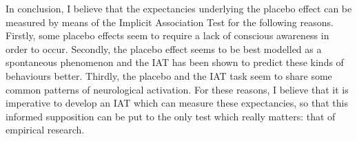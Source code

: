 In conclusion, I believe that the expectancies underlying the placebo effect can be measured by means of the Implicit Association Test for the following reasons. Firstly, some placebo effects seem to require a lack of conscious awareness in order to occur. Secondly, the placebo effect seems to be best modelled as a spontaneous phenomenon and the IAT has been shown to predict these kinds of behaviours better. Thirdly, the placebo and the IAT task seem to share some common patterns of neurological activation. For these reasons, I believe that it is imperative to develop an IAT which can measure these expectancies, so that this informed supposition can be put to the only test which really matters: that of empirical research.  

